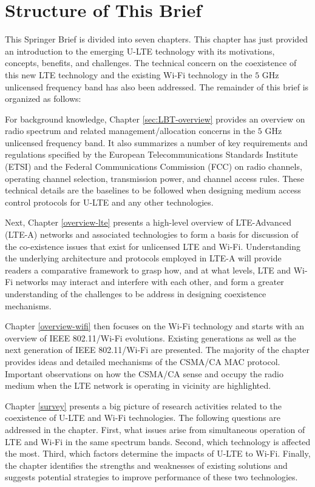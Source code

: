 \section{Structure of This Brief}

This Springer Brief is divided into seven chapters. This chapter has just provided an introduction to the emerging U-LTE technology with its motivations, concepts, benefits, and challenges. The technical concern on the coexistence of this new LTE technology and the existing Wi-Fi technology in the $5$ GHz unlicensed frequency band has also been addressed. The remainder of this brief is organized as follows: 

For background knowledge, Chapter \ref{sec:LBT-overview} provides an overview on radio spectrum and related management/allocation concerns in the $5$ GHz unlicensed frequency band. It also summarizes a number of key requirements and regulations specified by the European Telecommunications Standards Institute (ETSI) and the Federal Communications Commission (FCC) on radio channels, operating channel selection, transmission power, and channel access rules. These technical details are the baselines to be followed when designing medium access control protocols for U-LTE and any other technologies.

Next, Chapter \ref{overview-lte} presents a high-level overview of LTE-Advanced (LTE-A) networks and associated technologies to form a basis for discussion of the co-existence issues that exist for unlicensed LTE and Wi-Fi. Understanding the underlying architecture and protocols employed in LTE-A will provide readers a comparative framework to grasp how, and at what levels, LTE and Wi-Fi networks may interact and interfere with each other, and form a greater understanding of the challenges to be address in designing coexistence mechanisms.

Chapter \ref{overview-wifi} then focuses on the Wi-Fi technology and starts with an overview of IEEE 802.11/Wi-Fi evolutions. Existing generations as well as the next generation of IEEE 802.11/Wi-Fi are presented. The majority of the chapter provides ideas and detailed mechanisms of the CSMA/CA MAC protocol. Important observations on how the CSMA/CA sense and occupy the radio medium when the LTE network is operating in vicinity are highlighted.

Chapter \ref{survey} presents a big picture of research activities related to the coexistence of U-LTE and Wi-Fi technologies. The following questions are addressed in the chapter. First, what issues arise from simultaneous operation of LTE and Wi-Fi in the same spectrum bands. Second, which technology is affected the most. Third, which factors determine the impacts of U-LTE to Wi-Fi. Finally, the chapter identifies the strengths and weaknesses of existing solutions and suggests potential strategies to improve performance of these two technologies.

